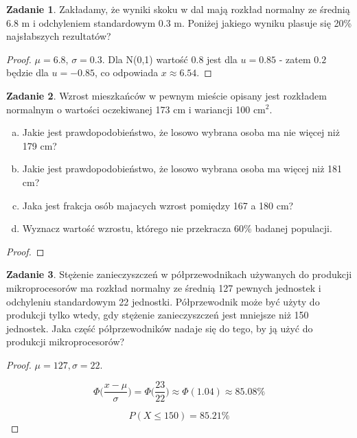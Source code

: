\documentclass[11pt]{article}
\theoremstyle{definition}
\newtheorem{zadanie}{Zadanie}
\numberwithin{zadanie}{section}
\begin{document}
\begin{zadanie}
    Zakładamy, że wyniki skoku w dal mają rozkład normalny ze średnią 6.8 m i odchyleniem standardowym 0.3 m.
    Poniżej jakiego wyniku plasuje się 20\% najsłabszych rezultatów?
\end{zadanie}
\begin{proof}
    $\mu=6.8$, $\sigma=0.3$. Dla N(0,1) wartość $0.8$ jest dla $u=0.85$ - zatem $0.2$ będzie dla $u=-0.85$, co odpowiada $x\approx 6.54$.
\end{proof}

\begin{zadanie}
    Wzrost mieszkańców w pewnym mieście opisany jest rozkładem normalnym o wartości oczekiwanej 173 cm i wariancji 100 $\text{cm}^2$.

    \begin{enumerate}[a)]
        \item Jakie jest prawdopodobieństwo, że losowo wybrana osoba ma nie więcej niż 179 cm?
        \item Jakie jest prawdopodobieństwo, że losowo wybrana osoba ma więcej niż 181 cm?
        \item Jaka jest frakcja osób majacych wzrost pomiędzy 167 a 180 cm?
        \item Wyznacz wartość wzrostu, którego nie przekracza 60\% badanej populacji.
    \end{enumerate}
\end{zadanie}
\begin{proof}

\end{proof}
\newpage
\begin{zadanie}
    Stężenie zanieczyszczeń w półprzewodnikach używanych do produkcji mikroprocesorów ma rozkład normalny ze średnią 127 pewnych jednostek i odchyleniu standardowym 22 jednostki. Półprzewodnik może być użyty do produkcji tylko wtedy, gdy stężenie zanieczyszczeń jest mniejsze niż 150 jednostek. Jaka część półprzewodników nadaje się do
    tego, by ją użyć do produkcji mikroprocesorów?
\end{zadanie}
\begin{proof}
    $\mu = 127, \sigma = 22$.

    $$\Phi\Big(\frac{x-\mu}{\sigma}\Big) = \Phi\Big(\frac{23}{22}\Big)\approx\Phi(1.04)\approx 85.08\%$$

    $$P(X\leq150) = 85.21\%$$
\end{proof}
\end{document}

